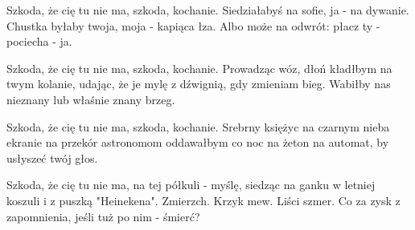 \begin{text}
    Szkoda, że cię tu nie ma,
    szkoda, kochanie.
    Siedziałabyś na sofie,
    ja - na dywanie.
    Chustka byłaby twoja,
    moja - kapiąca łza.
    Albo może na odwrót:
    płacz ty - pociecha - ja.

    Szkoda, że cię tu nie ma,
    szkoda, kochanie.
    Prowadząc wóz, dłoń kładłbym
    na twym kolanie,
    udając, że je mylę
    z dźwignią, gdy zmieniam bieg.
    Wabiłby nas nieznany
    lub właśnie znany brzeg.

    Szkoda, że cię tu nie ma,
    szkoda, kochanie.
    Srebrny księżyc na czarnym
    nieba ekranie
    na przekór astronomom
    oddawałbym co noc
    na żeton na automat,
    by usłyszeć twój głos.

    Szkoda, że cię tu nie ma,
    na tej półkuli -
    myślę, siedząc na ganku w letniej koszuli
    i z puszką "Heinekena".
    Zmierzch. Krzyk mew. Liści szmer.
    Co za zysk z zapomnienia,
    jeśli tuż po nim - śmierć?
\end{text}
\begin{chord}

\end{chord}